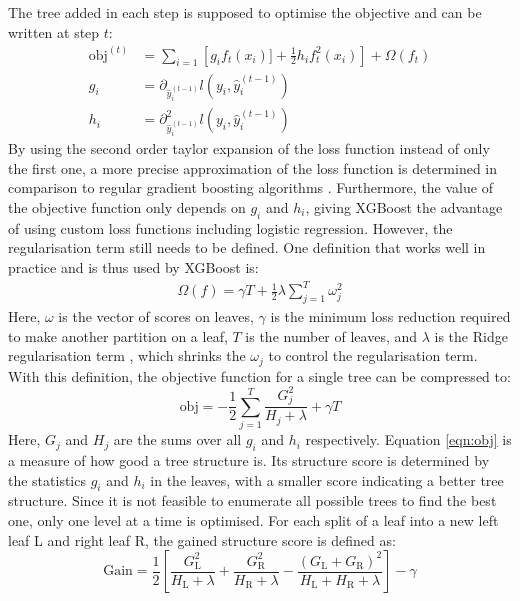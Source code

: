 The tree added in each step is supposed to optimise the objective and can be written at step $t$:
\begin{align}
  \text{obj}^{(t)} &= \sum_{i=1} \left[g_i f_t(x_i)] + \frac{1}{2}h_i f_t^2(x_i)\right] + \Omega(f_t)  \\
  g_i &= \partial_{\hat{y}_i^{(t-1)}} l(y_i, \hat{y}_i^{(t-1)}) \\
  h_i &= \partial^2_{\hat{y}_i^{(t-1)}} l(y_i, \hat{y}_i^{(t-1)})
\end{align}
By using the second order taylor expansion of the loss function instead of only the first one, a more precise approximation of the loss function is determined in comparison
to regular gradient boosting algorithms \cite{newton_boosting}.
Furthermore, the value of the objective function only depends on $g_i$ and $h_i$, giving XGBoost the advantage of using custom loss functions including logistic regression.
However, the regularisation term still needs to be defined. One definition that works well in practice and is thus used by XGBoost is:
\begin{align}
  \Omega (f) = \gamma T + \frac{1}{2}\lambda \sum_{j=1}^T \omega_j^2
\end{align}
Here, $\omega$ is the vector of scores on leaves, $\gamma$ is the minimum loss reduction required to make
another partition on a leaf, $T$ is the number of leaves, and $\lambda$ is the Ridge regularisation term \cite{ridge}, which shrinks the $\omega_j$ to control the
regularisation term. \\
With this definition, the objective function for a single tree can be compressed to:
\begin{equation} \label{eqn:obj}
  \text{obj} = -\frac{1}{2}\sum_{j=1}^T \frac{G_j^2}{H_j + \lambda} + \gamma T
\end{equation}
Here, $G_j$ and $H_j$ are the sums over all $g_i$ and $h_i$ respectively. Equation \ref{eqn:obj} is a measure of how good a tree structure is. Its structure score
is determined by the statistics $g_i$ and $h_i$ in the leaves, with a smaller score indicating a better tree structure.
Since it is not feasible to enumerate all possible trees to find the best one, only one level at a time is optimised.
For each split of a leaf into a new left leaf L and right leaf R, the gained structure score is defined as:
\begin{equation}
  \text{Gain} = \frac{1}{2}\left[\frac{G_{\text{L}}^2}{H_{\text{L}} + \lambda} + \frac{G_{\text{R}}^2}{H_{\text{R}} + \lambda} - \frac{(G_{\text{L}} + G_{\text{R}})^2}{H_{\text{L}}+H_{\text{R}}+\lambda}\right] -\gamma
\end{equation}

